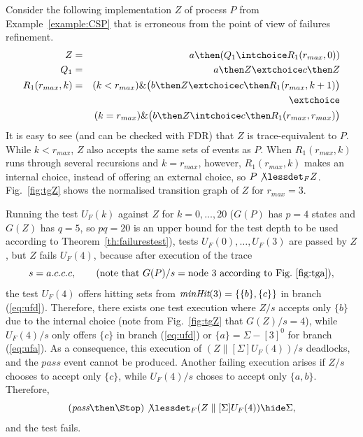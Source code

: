\begin{example}
\label{ex:uf1tests} Consider the following implementation $Z$ of process $P$
from Example~\ref{example:CSP} that is erroneous from the point of view of
failures refinement.
\begin{eqnarray*}
Z & = & a \then (Q_1 \intchoice R_1(r_{max},0))
\\
Q_1 & = & a\then Z \extchoice c\then Z
\\
R_1(r_{max},k) & = & (k < r_{max}) \& \big(b\then Z \extchoice  c\then R_1(r_{max},k+1)\big)
\\ & & \extchoice
\\ & & (k = r_{max}) \& \big(b\then Z \intchoice c\then R_1(r_{max},r_{max})\big)
\end{eqnarray*}
It is easy to see (and can be checked with FDR) that $Z$ is trace-equivalent
to $P$. While $k < r_{max}$, $Z$ also accepts the same sets of events as $P$.
When $R_1(r_{max},k)$ runs through several recursions and $k = r_{max}$,
however, $R_1(r_{max},k)$ makes an internal choice, instead of offering an
external choice, so $P\not\lessdet_F Z$. Fig.~\ref{fig:tgZ} shows the
normalised transition graph of $Z$ for $r_{max} = 3$.



Running the test $U_F(k)$ against $Z$ for $k=0,\dots,20$ ($G(P)$ has $p = 4$
states and $G(Z)$ has $q=5$, so $pq=20$ is an upper bound for the test depth
to be used according to Theorem~\ref{th:failurestest}), tests $U_F(0),\dots,
U_F(3)$ are passed by $Z$, but $Z$ fails $U_F(4)$, because after execution of
the trace
\[
s = a.c.c.c, \qquad\text{(note that $G(P)/s = \text{node}\ 3$ according to Fig.~\ref{fig:tga})},
\]
the test $U_F(4)$ offers hitting sets from $\text{\it minHit}(3) = \{\{b\},\{c\}\}$
in branch (\ref{eq:ufd}). Therefore,  there exists one test execution
where $Z/s$ accepts only $\{b\}$ due to the internal choice (note
from Fig.~\ref{fig:tgZ} that
$G(Z)/s = 4$), while $U_F(4)/s$
only offers $\{c\}$ in branch (\ref{eq:ufd}) or $\{ a\} = \Sigma - [3]^0$ for
branch (\ref{eq:ufa}).  As a consequence, this execution of
$(Z\parallel[\Sigma] U_F(4))/s$ deadlocks, and the $pass$ event cannot be
produced. Another failing execution arises if $Z/s$ chooses to accept only
$\{c \}$, while $U_F(4)/s$ choses to accept only $\{a,b\}$. Therefore,
\[
(\epass\then \Stop)\not\lessdet_F  (Z\parallel[\Sigma] U_F(4)) \hide\Sigma,
\]
and the test fails. \xbox
\end{example}

